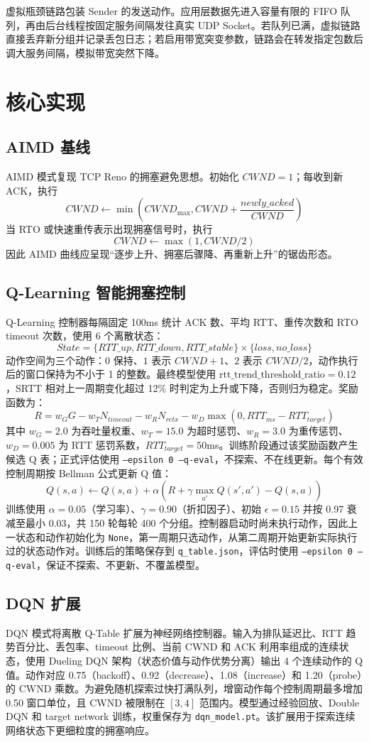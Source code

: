 \documentclass[a4paper, 11pt]{article}
\begin{document}
虚拟瓶颈链路包装 Sender 的发送动作。应用层数据先进入容量有限的 FIFO 队列，再由后台线程按固定服务间隔发往真实 UDP Socket。若队列已满，虚拟链路直接丢弃新分组并记录丢包日志；若启用带宽突变参数，链路会在转发指定包数后调大服务间隔，模拟带宽突然下降。

\section{核心实现}

\subsection{AIMD 基线}
AIMD 模式复现 TCP Reno 的拥塞避免思想。初始化 $CWND=1$；每收到新 ACK，执行
\[
CWND \leftarrow \min(CWND_{\max}, CWND + \frac{newly\_acked}{CWND})
\]
当 RTO 或快速重传表示出现拥塞信号时，执行
\[
CWND \leftarrow \max(1, CWND / 2)
\]
因此 AIMD 曲线应呈现“逐步上升、拥塞后骤降、再重新上升”的锯齿形态。

\subsection{Q-Learning 智能拥塞控制}
Q-Learning 控制器每隔固定 100ms 统计 ACK 数、平均 RTT、重传次数和 RTO timeout 次数，使用 6 个离散状态：
\[
State = \{RTT\_up, RTT\_down, RTT\_stable\} \times \{loss, no\_loss\}
\]
动作空间为三个动作：$0$ 保持、$1$ 表示 $CWND+1$、$2$ 表示 $CWND/2$，动作执行后的窗口保持为不小于 1 的整数。最终模型使用 $\text{rtt\_trend\_threshold\_ratio}=0.12$，SRTT 相对上一周期变化超过 12\% 时判定为上升或下降，否则归为稳定。奖励函数为：
\[
R = w_G G - w_T N_{timeout} - w_R N_{retx}
    - w_D \max(0, RTT_{ms}-RTT_{target})
\]
其中 $w_G=2.0$ 为吞吐量权重、$w_T=15.0$ 为超时惩罚、$w_R=3.0$ 为重传惩罚、$w_D=0.005$ 为 RTT 惩罚系数，$RTT_{target}=50$ms。训练阶段通过该奖励函数产生候选 Q 表；正式评估使用 \texttt{--epsilon 0 --q-eval}，不探索、不在线更新。每个有效控制周期按 Bellman 公式更新 Q 值：
\[
Q(s,a) \leftarrow Q(s,a) + \alpha (R + \gamma \max_{a'}Q(s',a') - Q(s,a))
\]
训练使用 $\alpha=0.05$（学习率）、$\gamma=0.90$（折扣因子）、初始 $\epsilon=0.15$ 并按 0.97 衰减至最小 0.03，共 150 轮每轮 400 个分组。控制器启动时尚未执行动作，因此上一状态和动作初始化为 \texttt{None}，第一周期只选动作，从第二周期开始更新实际执行过的状态动作对。训练后的策略保存到 \texttt{q\_table.json}，评估时使用 \texttt{--epsilon 0 --q-eval}，保证不探索、不更新、不覆盖模型。

\subsection{DQN 扩展}
DQN 模式将离散 Q-Table 扩展为神经网络控制器。输入为排队延迟比、RTT 趋势百分比、丢包率、timeout 比例、当前 CWND 和 ACK 利用率组成的连续状态，使用 Dueling DQN 架构（状态价值与动作优势分离）输出 4 个连续动作的 Q 值。动作对应 0.75（backoff）、0.92（decrease）、1.08（increase）和 1.20（probe）的 CWND 乘数。为避免随机探索过快打满队列，增窗动作每个控制周期最多增加 0.50 窗口单位，且 CWND 被限制在 $[3, 4]$ 范围内。模型通过经验回放、Double DQN 和 target network 训练，权重保存为 \texttt{dqn\_model.pt}。该扩展用于探索连续网络状态下更细粒度的拥塞响应。
\end{document}
